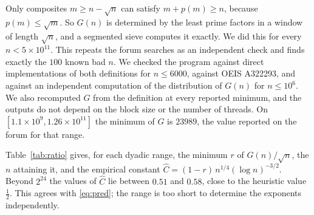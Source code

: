 \documentclass[11pt,letterpaper]{article}
\theoremstyle{remark}
\begin{document}
Only composites $m\ge n-\sqrt n$ can satisfy $m+p(m)\ge n$, because
$p(m)\le\sqrt m$. So $G(n)$ is determined by the least prime factors in a
window of length $\sqrt n$, and a segmented sieve computes it exactly. We did
this for every $n<5\times10^{11}$. This repeats the forum searches as an independent
check and finds exactly the $100$ known bad $n$. We checked the program
against direct implementations of both definitions for $n\le6000$, against
OEIS A322293, and against an independent computation of the distribution of
$G(n)$ for $n\le10^6$. We also recomputed $G$ from the definition at every
reported minimum, and the outputs do not depend on the block size or the
number of threads. On $[1.1\times10^9,1.26\times10^{11}]$ the minimum of $G$ is
$23989$, the value reported on the forum for that range.

Table~\ref{tab:ratio} gives, for each dyadic range, the minimum $r$ of
$G(n)/\sqrt n$, the $n$ attaining it, and the empirical constant
$\hat C=(1-r)\,n^{1/4}(\log n)^{-3/2}$. Beyond $2^{24}$ the values of $\hat C$
lie between $0.51$ and $0.58$, close to the heuristic value $\tfrac12$.
This agrees with \eqref{eq:pred}; the range is too short to determine the
exponents independently.
\end{document}
